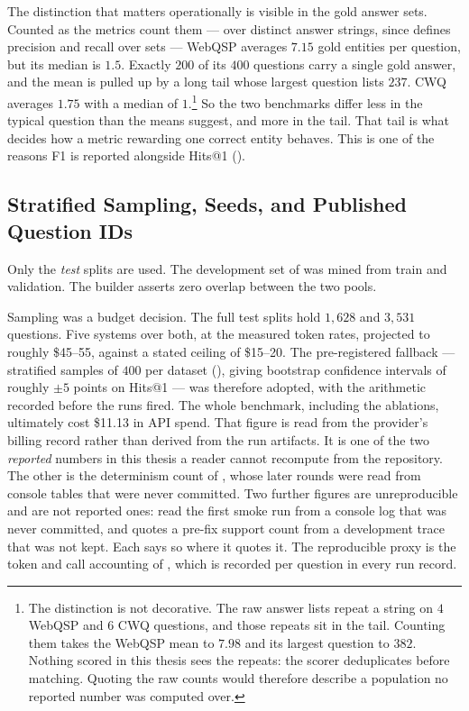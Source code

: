 The distinction that matters operationally is visible in the gold answer sets.
Counted as the metrics count them --- over distinct answer strings, since
 defines precision and recall over sets --- WebQSP averages
$7.15$ gold entities per question, but its median is $1.5$. Exactly $200$ of its
$400$ questions carry a single gold answer, and the mean is pulled up by a long
tail whose largest question lists $237$. CWQ averages $1.75$ with a median of
$1$.\footnote{The distinction is not decorative. The raw answer lists repeat a
string on $4$ WebQSP and $6$ CWQ questions, and those repeats sit in the tail.
Counting them takes the WebQSP mean to $7.98$ and its largest question to
$382$. Nothing scored in this thesis sees the repeats: the scorer
deduplicates before matching. Quoting the raw counts would therefore describe a
population no reported number was computed over.} So the two benchmarks differ
less in the typical question than the means suggest, and more in the tail. That
tail is what decides how a metric rewarding one correct entity
behaves. This is one of the reasons F1 is reported alongside Hits@1
().

\subsection{Stratified Sampling, Seeds, and Published Question IDs}

Only the \emph{test} splits are used. The development set of
 was mined from train and validation. The builder
asserts zero overlap between the two pools.

Sampling was a budget decision. The full test splits hold $1{,}628$ and
$3{,}531$ questions. Five systems over both, at the measured token rates,
projected to roughly \$45--55, against a stated ceiling of \$15--20. The
pre-registered fallback --- stratified samples of $400$ per dataset
(), giving bootstrap confidence intervals of roughly $\pm 5$
points on Hits@1 --- was therefore adopted, with the arithmetic recorded before
the runs fired. The whole benchmark, including the ablations, ultimately cost
\$11.13 in API spend. That figure is read from the provider's billing record
rather than derived from the run artifacts. It is one of the two
\emph{reported} numbers in this thesis a reader cannot recompute from the
repository. The other is the determinism count of , whose
later rounds were read from console tables that were never committed. Two
further figures are unreproducible and are not reported ones:
 read the first smoke run from a console log that
was never committed, and  quotes a pre-fix support
count from a development trace that was not kept. Each says so where it quotes
it. The reproducible proxy is the token and call accounting of
, which is recorded per question in every run record.

